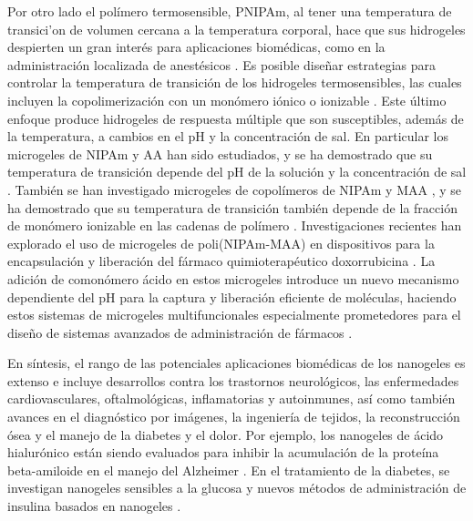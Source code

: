 
Por otro lado el pol\'imero termosensible, PNIPAm, al tener una temperatura de transici'on de volumen cercana a la temperatura corporal, hace que sus hidrogeles despierten un gran inter\'es para aplicaciones biom\'edicas, como en la administraci\'on localizada de anest\'esicos \cite{Guan2011, indulekha2016thermoresponsive}.
Es posible dise\~nar estrategias para controlar la temperatura de transici\'on de los hidrogeles termosensibles, las cuales incluyen la copolimerizaci\'on con un mon\'omero i\'onico o ionizable \cite{Cai2007,Macchione2019, Hirose1987,Lopez2020}.
Este \'ultimo enfoque produce hidrogeles de respuesta m\'ultiple que son susceptibles, adem\'as de la temperatura, a cambios en el pH y la concentraci\'on de sal.
En particular los microgeles de NIPAm y AA han sido estudiados, y se ha demostrado que su temperatura de transici\'on depende del pH de la soluci\'on y la concentraci\'on de sal \cite{Morris1997, Jones2000,Bradley2005,Begum2016}.
Tambi\'en se han investigado microgeles de copol\'imeros de NIPAm y MAA \cite{Dowding2000,Hoare2004,Giussi2015}, y se ha demostrado que su temperatura de transici\'on tambi\'en depende de la fracci\'on de mon\'omero ionizable en las cadenas de pol\'imero \cite{Morris1997,Jones2000, Hoare2004, Bradley2005, Lee2008,Wong2009,Hamzavi2016}.
Investigaciones recientes han explorado el uso de microgeles de poli(NIPAm-MAA) en dispositivos para la encapsulaci\'on y liberaci\'on del f\'armaco quimioterap\'eutico doxorrubicina \cite{Giussi2020, MartinezMoro2020, Pergushov2020}. La adici\'on de comon\'omero \'acido en estos microgeles introduce un nuevo mecanismo dependiente del pH para la captura y liberaci\'on eficiente de mol\'eculas, haciendo estos sistemas de microgeles multifuncionales especialmente prometedores para el dise\~no de sistemas avanzados de administraci\'on de f\'armacos \cite{Liu2017}.

En s\'intesis, el rango de las potenciales aplicaciones biom\'edicas de los nanogeles es extenso e incluye desarrollos contra los trastornos neurol\'ogicos, las enfermedades cardiovasculares, oftalmol\'ogicas, inflamatorias y autoinmunes, as\'i como tambi\'en avances en el diagn\'ostico por im\'agenes, la ingenier\'ia de tejidos, la reconstrucci\'on \'osea y el manejo de la diabetes y el dolor. Por ejemplo, los nanogeles de \'acido hialur\'onico est\'an siendo evaluados para inhibir la acumulaci\'on de la prote\'ina beta-amiloide en el manejo del Alzheimer \cite{jiang2018nanogels}. En el tratamiento de la diabetes, se investigan nanogeles sensibles a la glucosa \cite{wu2010multifunctional} y nuevos m\'etodos de administraci\'on de insulina basados en nanogeles \cite{nolan2004thermally}.

